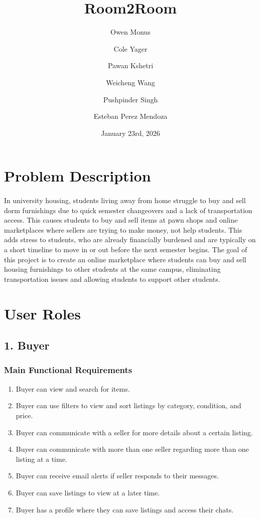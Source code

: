 \documentclass[12pt]{article}
\title{Room2Room}
\author{
    Owen Monus \and
    Cole Yager \and
    Pawan Kshetri \and
    Weicheng Wang \and
    Pushpinder Singh \and
    Esteban Perez Mendoza
    }
\date{January 23rd, 2026}
\begin{document}
\maketitle
{}

\section*{Problem Description}
\paragraph{} In university housing, students living away from home struggle to buy and sell dorm
furnishings due to quick semester changeovers and a lack of transportation access. This
causes students to buy and sell items at pawn shops and online marketplaces where sellers
are trying to make money, not help students. This adds stress to students, who are already
financially burdened and are typically on a short timeline to move in or out before the
next semester begins. The goal of this project is to create an online marketplace where
students can buy and sell housing furnishings to other students at the same campus,
eliminating transportation issues and allowing students to support other students.

\section*{User Roles}

\subsection*{1. Buyer}
\subsubsection*{Main Functional Requirements}
\begin{enumerate}[label=\arabic*.]
    \item Buyer can view and search for items.
    \item Buyer can use filters to view and sort listings by category, condition, and price.
    \item Buyer can communicate with a seller for more details about a certain listing.
    \item Buyer can communicate with more than one seller regarding more than one listing at a time.
    \item Buyer can receive email alerts if seller responds to their messages.
    \item Buyer can save listings to view at a later time.
    \item Buyer has a profile where they can save listings and access their chats.
\end{enumerate}
\end{document}
